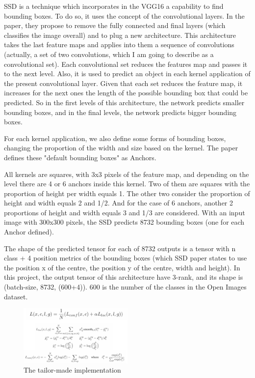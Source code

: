 \documentclass[11pt, a4paper, twocolumn]{article}
\begin{document}
SSD is a technique which incorporates in the VGG16 a capability to find bounding boxes. To do so, it uses the concept of the convolutional layers. In the paper, they propose to remove the fully connected and final layers (which classifies the image overall) and to plug a new architecture. This architecture takes the last feature maps and applies into them a sequence of convolutions (actually, a set of two convolutions, which I am going to describe as a convolutional set). Each convolutional set reduces the features map and passes it to the next level. Also, it is used to predict an object in each kernel application of the present convolutional layer. Given that each set reduces the feature map, it increases for the next ones the length of the possible bounding box that could be predicted. So in the first levels of this architecture, the network predicts smaller bounding boxes, and in the final levels, the network predicts bigger bounding boxes.

For each kernel application, we also define some forms of bounding boxes, changing the proportion of the width and size based on the kernel. The paper defines these "default bounding boxes" as Anchors.

All kernels are squares, with 3x3 pixels of the feature map, and depending on the level there are 4 or 6 anchors inside this kernel. Two of them are squares with the proportion of height per width equals 1. The other two consider the proportion of height and width equals 2 and 1/2. And for the case of 6 anchors, another 2 proportions of height and width equals 3 and 1/3 are considered. With an input image with 300x300 pixels, the SSD predicts 8732 bounding boxes (one for each Anchor defined).

The shape of the predicted tensor for each of 8732 outputs is a tensor with n class + 4 position metrics of the bounding boxes (which SSD paper states to use the position x of the centre, the position y of the centre, width and height). In this project, the output tensor of this architecture have 3-rank, and its shape is (batch-size, 8732, (600+4)). 600 is the number of the classes in the Open Images dataset.

\begin{figure}[!ht]
	\centering
	\includegraphics[width=0.5\textwidth]{loss.jpg}
	\caption{\scriptsize The tailor-made implementation \cite{losscode}}
	\label{losscode}
\end{figure}
\end{document}
